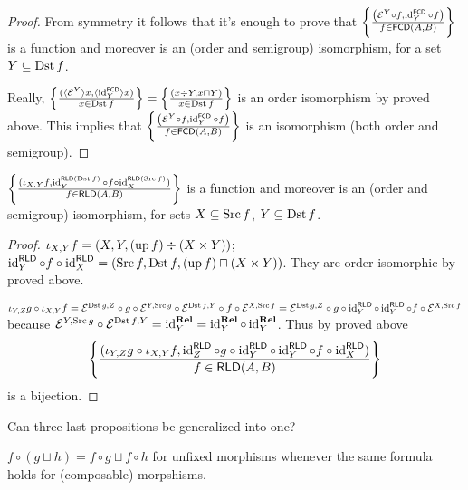 \begin{proof}
  From symmetry it follows that it's enough to prove that $\left\{ \frac{ \left(
  \mathcal{E}^Y \circ f , \operatorname{id}^{\mathsf{FCD}}_Y \circ f \right)
  }{ f \in \mathsf{FCD} (A , B) }\right\}$ is a
  function and moreover is an (order and semigroup) isomorphism, for a set $Y
  \subseteq \operatorname{Dst} f$.
  
  Really, $\left\{ \frac{ (\langle \mathcal{E}^Y \rangle x , \langle
  \operatorname{id}^{\mathsf{FCD}}_Y \rangle x) }{ x
  \in \operatorname{Dst} f }\right\} = \left\{ \frac{ (x \div Y , x \sqcap Y) }{
  x \in \operatorname{Dst} f }\right\}$ is an order isomorphism by proved
  above. This implies that $\left\{ \frac{ \left( \mathcal{E}^Y \circ f ,
  \operatorname{id}^{\mathsf{FCD}}_Y \circ f \right) }{
  f \in \mathsf{FCD} (A , B) }\right\}$ is an isomorphism
  (both order and semigroup).
\end{proof}

\begin{prop}
  $\left\{ \frac{ (\iota_{X, Y} f , \operatorname{id}^{\mathsf{RLD}(\operatorname{Dst} f)}_Y \circ f \circ
  \operatorname{id}^{\mathsf{RLD}(\operatorname{Src} f)}_X) }{ f \in
  \mathsf{RLD} (A , B) }\right\}$ is a function and moreover is an
  (order and semigroup) isomorphism, for sets $X \subseteq \operatorname{Src} f$, $Y
  \subseteq \operatorname{Dst} f$.
\end{prop}

\begin{proof}
  $\iota_{X, Y} f = (X , Y , (\operatorname{up} f) \div (X \times Y))$;
  $\operatorname{id}^{\mathsf{RLD}}_Y \circ f \circ
  \operatorname{id}^{\mathsf{RLD}}_X = (\operatorname{Src} f , \operatorname{Dst} f ,
  (\operatorname{up} f) \sqcap (X \times Y))$. They are order isomorphic by proved
  above.
  
  $\iota_{Y, Z} g \circ \iota_{X, Y} f =\mathcal{E}^{\operatorname{Dst} g,Z} \circ g \circ
  \mathcal{E}^{Y,\operatorname{Src} g} \circ \mathcal{E}^{\operatorname{Dst} f,Y} \circ f \circ \mathcal{E}^{X,\operatorname{Src} f} =\mathcal{E}^{\operatorname{Dst} g,Z} \circ g \circ \operatorname{id}^{\mathsf{RLD}}_Y \circ
  \operatorname{id}^{\mathsf{RLD}}_Y \circ f \circ \mathcal{E}^{X,\operatorname{Src} f}$
  because $\mathcal{E}^{Y,\operatorname{Src} g} \circ \mathcal{E}^{\operatorname{Dst} f,Y} =
  \operatorname{id}^{\mathbf{Rel}}_Y = \operatorname{id}^{\mathbf{Rel}}_Y
  \circ \operatorname{id}^{\mathbf{Rel}}_Y$. Thus by proved above
  \[ \left\{ \frac{ (\iota_{Y, Z} g \circ \iota_{X, Y} f ,
     \operatorname{id}^{\mathsf{RLD}}_Z \circ g \circ
     \operatorname{id}^{\mathsf{RLD}}_Y \circ \operatorname{id}^{\mathsf{RLD}}_Y
     \circ f \circ \operatorname{id}^{\mathsf{RLD}}_X) }{
     f \in \mathsf{RLD} (A , B) }\right\} \]
  is a bijection.
\end{proof}

Can three last propositions be generalized into one?

\begin{prop}\label{f-circcup-unfix}
$f \circ (g \sqcup h) = f \circ g \sqcup f \circ h$
for unfixed morphisms whenever the same formula
holds for (composable) morpshisms.
\end{prop}

